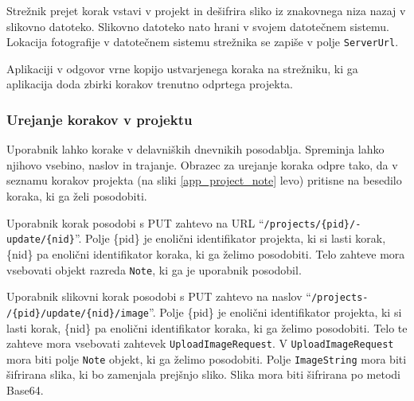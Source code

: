 \documentclass[a4paper, 12pt]{book}
\begin{document}
Strežnik prejet korak vstavi v projekt in dešifrira sliko iz znakovnega niza nazaj v slikovno datoteko.
Slikovno datoteko nato hrani v svojem datotečnem sistemu.
Lokacija fotografije v datotečnem sistemu strežnika se zapiše v polje \texttt{ServerUrl}.

Aplikaciji v odgovor vrne kopijo ustvarjenega koraka na strežniku, ki ga aplikacija doda zbirki korakov trenutno odprtega projekta.


% 
% 



\subsubsection{Urejanje korakov v projektu}

Uporabnik lahko korake v delavniških dnevnikih posodablja.
Spreminja lahko njihovo vsebino, naslov in trajanje.
Obrazec za urejanje koraka odpre tako, da v seznamu korakov projekta (na sliki \ref{app_project_note} levo) pritisne na besedilo koraka, ki ga želi posodobiti. 

Uporabnik korak posodobi s PUT zahtevo na URL \enquote{\texttt{/projects/\{pid\}/-\\update/\{nid\}}}.
Polje \{pid\} je enolični identifikator projekta, ki si lasti korak, \{nid\} pa enolični identifikator koraka, ki ga želimo posodobiti.
Telo zahteve mora vsebovati objekt razreda \texttt{Note}, ki ga je uporabnik posodobil.

Uporabnik slikovni korak posodobi s PUT zahtevo na naslov \enquote{\texttt{/projects-\\/\{pid\}/update/\{nid\}/image}}.
Polje \{pid\} je enolični identifikator projekta, ki si lasti korak, \{nid\} pa enolični identifikator koraka, ki ga želimo posodobiti.
Telo te zahteve mora vsebovati zahtevek \texttt{UploadImageRequest}.
V \texttt{UploadImageRequest} mora biti polje \texttt{Note} objekt, ki ga želimo posodobiti.
Polje \texttt{ImageString} mora biti šifrirana slika, ki bo zamenjala prejšnjo sliko.
Slika mora biti šifrirana po metodi Base64.
\end{document}
